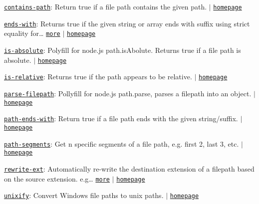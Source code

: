 \begin{DoxyItemize}
\item \href{https://www.npmjs.com/package/contains-path}{\tt contains-\/path}\+: Return true if a file path contains the given path. $\vert$ \href{https://github.com/jonschlinkert/contains-path}{\tt homepage}
\item \href{https://www.npmjs.com/package/ends-with}{\tt ends-\/with}\+: Returns {\ttfamily true} if the given {\ttfamily string} or {\ttfamily array} ends with {\ttfamily suffix} using strict equality for… \href{https://github.com/jonschlinkert/ends-with}{\tt more} $\vert$ \href{https://github.com/jonschlinkert/ends-with}{\tt homepage}
\item \href{https://www.npmjs.com/package/is-absolute}{\tt is-\/absolute}\+: Polyfill for node.\+js {\ttfamily path.\+is\+Abolute}. Returns true if a file path is absolute. $\vert$ \href{https://github.com/jonschlinkert/is-absolute}{\tt homepage}
\item \href{https://www.npmjs.com/package/is-relative}{\tt is-\/relative}\+: Returns {\ttfamily true} if the path appears to be relative. $\vert$ \href{https://github.com/jonschlinkert/is-relative}{\tt homepage}
\item \href{https://www.npmjs.com/package/parse-filepath}{\tt parse-\/filepath}\+: Pollyfill for node.\+js {\ttfamily path.\+parse}, parses a filepath into an object. $\vert$ \href{https://github.com/jonschlinkert/parse-filepath}{\tt homepage}
\item \href{https://www.npmjs.com/package/path-ends-with}{\tt path-\/ends-\/with}\+: Return {\ttfamily true} if a file path ends with the given string/suffix. $\vert$ \href{https://github.com/jonschlinkert/path-ends-with}{\tt homepage}
\item \href{https://www.npmjs.com/package/path-segments}{\tt path-\/segments}\+: Get n specific segments of a file path, e.\+g. first 2, last 3, etc. $\vert$ \href{https://github.com/jonschlinkert/path-segments}{\tt homepage}
\item \href{https://www.npmjs.com/package/rewrite-ext}{\tt rewrite-\/ext}\+: Automatically re-\/write the destination extension of a filepath based on the source extension. e.\+g… \href{https://github.com/jonschlinkert/rewrite-ext}{\tt more} $\vert$ \href{https://github.com/jonschlinkert/rewrite-ext}{\tt homepage}
\item \href{https://www.npmjs.com/package/unixify}{\tt unixify}\+: Convert Windows file paths to unix paths. $\vert$ \href{https://github.com/jonschlinkert/unixify}{\tt homepage}
\end{DoxyItemize}

